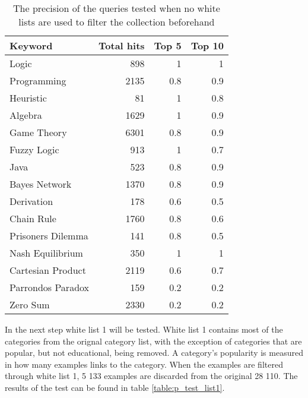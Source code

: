 \begin{table}[H]
\centering
\begin{tabular} {|| p{15em} | r | r | r ||} 
 \hline
 Keyword & Total hits & Top 5 & Top 10 \\ [0.5ex] 
 \hline

Logic & 898 & 1 & 1 \\
Programming & 2135 & 0.8 & 0.9 \\
Heuristic & 81 & 1 & 0.8 \\
Algebra & 1629 & 1 & 0.9 \\
Game Theory & 6301 & 0.8 & 0.9 \\
\hline
Fuzzy Logic & 913 & 1 & 0.7 \\
Java & 523 & 0.8 & 0.9 \\
Bayes Network & 1370 & 0.8 & 0.9 \\
Derivation & 178 & 0.6 & 0.5 \\
\hline
Chain Rule & 1760 & 0.8 & 0.6 \\
Prisoners Dilemma & 141 & 0.8 & 0.5 \\
Nash Equilibrium & 350 & 1 & 1 \\
Cartesian Product & 2119 & 0.6 & 0.7 \\
Parrondos Paradox & 159 & 0.2 & 0.2 \\
Zero Sum & 2330 & 0.2 & 0.2 \\

 \hline
\end{tabular}
\caption{The precision of the queries tested when no white lists are used to filter the collection beforehand}
\label{table:p_test_no-list}
\end{table}

In the next step white list 1 will be tested. White list 1 contains most of the categories from the orignal category list, with the exception of categories that are popular, but not educational, being removed. A category's popularity is measured in how many examples links to the category. When the examples are filtered through white list 1, 5 133 examples are discarded from the original 28 110. The results of the test can be found in table \ref{table:p_test_list1}.

